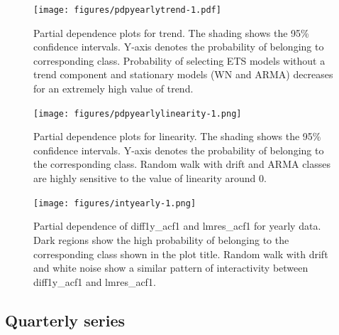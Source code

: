 \documentclass[11pt,a4paper,]{article}
\begin{document}
\begin{figure}
\centering
\texttt{[image: figures/pdpyearlytrend-1.pdf]}
\caption{\label{fig:pdpyearlytrend}Partial dependence plots for trend. The shading shows the 95\% confidence intervals. Y-axis denotes the probability of belonging to corresponding class. Probability of selecting ETS models without a trend component and stationary models (WN and ARMA) decreases for an extremely high value of trend.}
\end{figure}

\begin{figure}
\centering
\texttt{[image: figures/pdpyearlylinearity-1.png]}
\caption{\label{fig:pdpyearlylinearity}Partial dependence plots for linearity. The shading shows the 95\% confidence intervals. Y-axis denotes the probability of belonging to the corresponding class. Random walk with drift and ARMA classes are highly sensitive to the value of linearity around 0.}
\end{figure}

\begin{figure}
\centering
\texttt{[image: figures/intyearly-1.png]}
\caption{\label{fig:intyearly}Partial dependence of diff1y\_acf1 and lmres\_acf1 for yearly data. Dark regions show the high probability of belonging to the corresponding class shown in the plot title. Random walk with drift and white noise show a similar pattern of interactivity between diff1y\_acf1 and lmres\_acf1.}
\end{figure}

\hypertarget{quarterly-series}{%
\subsection{Quarterly series}\label{quarterly-series}}
\end{document}
